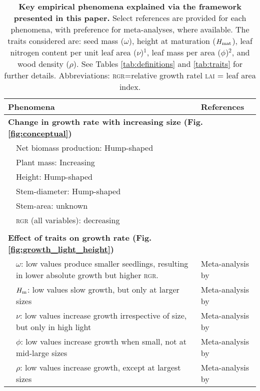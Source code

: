 \documentclass[a4paper,11pt]{article}
\begin{document}
\begin{table}[ht]
\caption{\textbf{Key empirical phenomena explained via the framework presented in this paper.}
Select references are provided for each phenomena, with preference for meta-analyses, where available. The traits considered are: seed mass ($\omega$), height at maturation ($H_{{\rm mat}}$), leaf nitrogen content per unit leaf area ($\nu$)$^1$, leaf mass per area ($\phi$)$^2$, and wood density ($\rho$). See Tables \ref{tab:definitions} and \ref{tab:traits} for further details. Abbreviations: \textsc{rgr}=relative growth ratel \textsc{lai} = leaf area index.
}
{\footnotesize
{
  \begin{tabular}{p{0.01cm}p{7.5cm}p{7cm}}
  \\
  \hline
  \multicolumn{2}{l}{ Phenomena} & References \\
  \hline
  \multicolumn{3}{l}{\bf{Change in growth rate with increasing size} (Fig. \ref{fig:conceptual})}\\
  & Net biomass production: Hump-shaped & \citet{Givnish-1988, Koch-2004} \\
  & Plant mass: Increasing & \citet{Sillett-2010, Stephenson-2014} \\
  & Height: Hump-shaped &  \citet{Ryan-2006, Sillett-2010, King-2011} \\
  & Stem-diameter: Hump-shaped &  \citet{Canham-2004, Canham-2006, Herault-2011} \\
  & Stem-area: unknown & \\
  & \textsc{rgr} (all variables): decreasing & \citet{Rees-2010, Iida-2014}\\
  \\
  \multicolumn{3}{l}{\bf{Effect of traits on growth rate} (Fig. \ref{fig:growth_light_height})}\\
  & $\omega$: low values produce smaller seedlings, resulting in lower absolute growth but higher \textsc{rgr}. & Meta-analysis by \citet{Gibert-2016} \\
  & $H_{\rm m}$: low values slow growth, but only at larger sizes & Meta-analysis by \citet{Gibert-2016}\\
  & $\nu$: low values increase growth irrespective of size, but only in high light & Meta-analysis by \citet{Gibert-2016}\\
  & $\phi$: low values increase growth when small, not at mid-large sizes & Meta-analysis by \citet{Gibert-2016}\\
  & $\rho$: low values increase growth, except at largest sizes & Meta-analysis by \citet{Gibert-2016}\\


\end{tabular}}}
\end{table}
\end{document}
